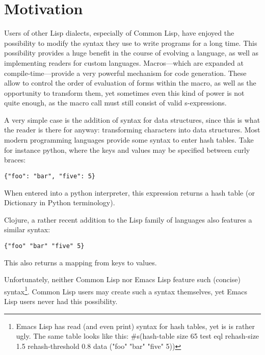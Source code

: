\documentclass[a4paper,10pt,twoside]{article}
\newcommand{\el}{Emacs Lisp}
\newcommand{\cl}{Common Lisp}
\begin{document}
\section{Motivation}
\label{sec:motivation}
Users of other Lisp dialects, especially of \cl{}, have enjoyed the possibility
to modify the syntax they use to write programs for a long time.  This
possibility provides a huge benefit in the course of evolving a language, as
well as implementing readers for custom languages.  Macros---which are expanded
at compile-time---provide a very powerful mechanism for code generation.  These
allow to control the order of evaluation of forms within the macro, as well as
the opportunity to transform them, yet sometimes even this kind of power is not
quite enough, as the macro call must still consist of valid s-expressions.

A very simple case is the addition of syntax for data structures, since this is
what the reader is there for anyway: transforming characters into data
structures.  Most modern programming languages provide some syntax to enter hash
tables.  Take for instance python, where the keys and values may be specified
between curly braces:


\begin{lstlisting}[style=pythoncode]
{"foo": "bar", "five": 5}
\end{lstlisting}

When entered into a python interpreter, this expression returns a hash table (or
Dictionary in Python terminology).

Clojure, a rather recent addition to the Lisp family of languages also features
a similar syntax:


\begin{lstlisting}[style=lispinline]
{"foo" "bar" "five" 5}
\end{lstlisting}

This also returns a mapping from keys to values.

Unfortunately, neither \cl{} nor \el{} feature such (concise)
syntax\footnote{\el{} has read (and even print) syntax for hash tables, yet is
  is rather ugly.  The same table looks like this: \#s(hash-table size 65 test
  eql rehash-size 1.5 rehash-threshold 0.8 data ("foo" "bar" "five" 5))}.  \cl{}
users may create such a syntax themselves, yet \el{} users never had this
possibility.
\end{document}
